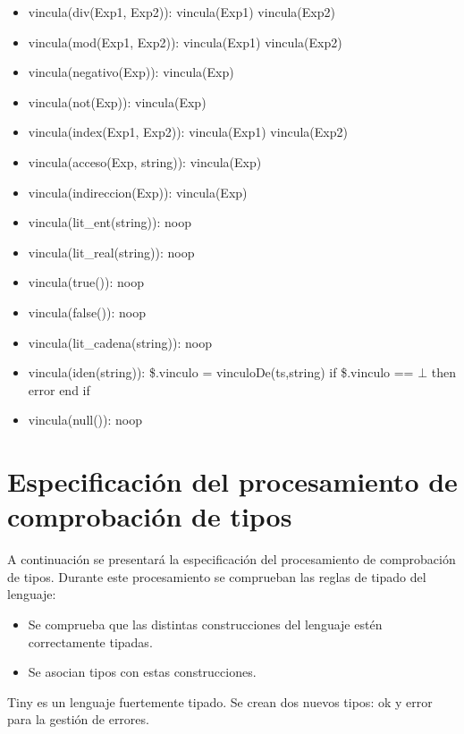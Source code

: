 \documentclass[11pt]{article}
\begin{document}
\begin{itemize}
                \item vincula(div(Exp1, Exp2)): 
                    \subitem vincula(Exp1) 
                    \subitem vincula(Exp2)
                \item vincula(mod(Exp1, Exp2)): 
                    \subitem vincula(Exp1) 
                    \subitem vincula(Exp2)
                \item vincula(negativo(Exp)): 
                    \subitem vincula(Exp)
                \item vincula(not(Exp)): 
                    \subitem vincula(Exp)
                \item vincula(index(Exp1, Exp2)): 
                    \subitem vincula(Exp1) 
                    \subitem vincula(Exp2)
                \item vincula(acceso(Exp, string)): 
                    \subitem vincula(Exp)
                \item vincula(indireccion(Exp)): 
                    \subitem vincula(Exp)
                \item vincula(lit\_ent(string)): 
                    \subitem noop
                \item vincula(lit\_real(string)): 
                    \subitem noop
                \item vincula(true()): 
                    \subitem noop
                \item vincula(false()): 
                    \subitem noop
                \item vincula(lit\_cadena(string)): 
                    \subitem noop
                \item vincula(iden(string)): 
                    \subitem \$.vinculo = vinculoDe(ts,string) 
                    \subitem if \$.vinculo == $\bot$ then 
                        \subsubitem error 
                    \subitem end if
                \item vincula(null()): 
                    \subitem noop
            \end{itemize}

    
    \section{Especificación del procesamiento de comprobación de tipos}
        A continuación se presentará la especificación del procesamiento de comprobación de tipos. Durante este procesamiento se comprueban las reglas de tipado del lenguaje:
        \begin{itemize}
            \item Se comprueba que las distintas construcciones del lenguaje estén
            correctamente tipadas.
            \item Se asocian tipos con estas construcciones.
        \end{itemize}
        Tiny es un lenguaje fuertemente tipado. Se crean dos nuevos tipos: ok y error para la gestión de errores.
        
\end{document}
